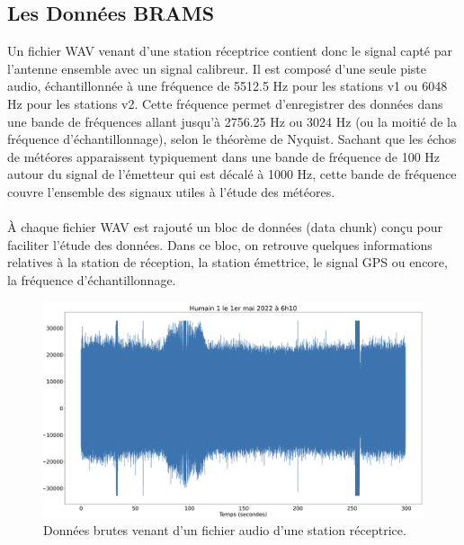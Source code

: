 \documentclass[11pt]{article}
\begin{document}


\subsection{Les Données BRAMS}

Un fichier WAV venant d'une station réceptrice contient donc le signal capté par l'antenne ensemble avec un signal calibreur.
Il est composé d'une seule piste audio, échantillonnée à une fréquence de 5512.5 Hz pour les stations v1 ou 6048 Hz pour les stations v2.
Cette fréquence permet d'enregistrer des données dans une bande de fréquences allant jusqu'à 2756.25 Hz ou 3024 Hz (ou la moitié de la fréquence d'échantillonnage), selon le théorème de Nyquist.
Sachant que les échos de météores apparaissent typiquement dans une bande de fréquence de 100 Hz autour du signal de l'émetteur qui est décalé à 1000 Hz, cette bande de fréquence couvre l'ensemble des signaux utiles à l'étude des météores.\\
\\
À chaque fichier WAV est rajouté un bloc de données (data chunk) conçu pour faciliter l'étude des données.
Dans ce bloc, on retrouve quelques informations relatives à la station de réception, la station émettrice, le signal GPS ou encore, la fréquence d'échantillonnage.

\begin{figure}[h]
    \begin{center}
        \includegraphics[scale=0.155]{wav_brut.png}
        \caption{Données brutes venant d'un fichier audio d'une station réceptrice.}
        \label{fig:wav_brut}
    \end{center}
\end{figure}
\end{document}
